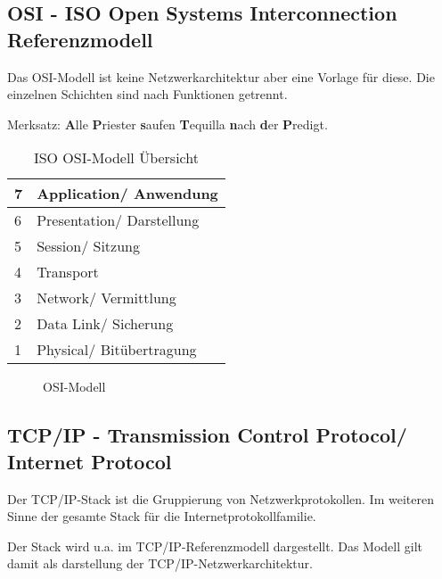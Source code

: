 \subsection{OSI - ISO Open Systems Interconnection Referenzmodell}

Das OSI-Modell ist keine Netzwerkarchitektur aber eine Vorlage für diese. Die einzelnen Schichten sind nach Funktionen getrennt.

Merksatz: \textbf{A}lle \textbf{P}riester \textbf{s}aufen  \textbf{T}equilla \textbf{n}ach \textbf{d}er \textbf{P}redigt.

\begin{table}[H]
    \centering
    \begin{tabular}{|l|l|}
        \hline
        7 & Application/ Anwendung    \\\hline
        6 & Presentation/ Darstellung \\\hline
        5 & Session/ Sitzung          \\\hline
        4 & Transport                 \\\hline
        3 & Network/ Vermittlung      \\\hline
        2 & Data Link/ Sicherung      \\\hline
        1 & Physical/ Bitübertragung  \\\hline
    \end{tabular}
    \caption{ISO OSI-Modell Übersicht}
\end{table}

\begin{figure}[H]
    \centering
    
    \caption{OSI-Modell}
\end{figure}
\FloatBarrier

\subsection{TCP/IP - Transmission Control Protocol/ Internet Protocol}

Der TCP/IP-Stack ist die Gruppierung von Netzwerkprotokollen. Im weiteren Sinne der gesamte Stack für die Internetprotokollfamilie.

Der Stack wird u.a. im TCP/IP-Referenzmodell dargestellt. Das Modell gilt damit als darstellung der TCP/IP-Netzwerkarchitektur.


